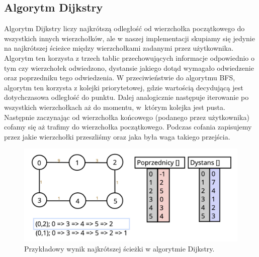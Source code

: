 \documentclass[10pt, a4paper]{report}
\begin{document}
    \subsection{Algorytm Dijkstry}
    Algorytm Dijkstry liczy najkrótszą odległość od wierzchołka początkowego do wszystkich innych wierzchołków, ale w naszej implementacji skupiamy się jedynie na najkrótszej ścieżce między wierzchołkami zadanymi przez użytkownika. 
    Algorytm ten korzysta z trzech tablic przechowujących informacje odpowiednio o tym czy wierzchołek odwiedzono, dystansie jakiego dotąd wymagało odwiedzenie oraz poprzedniku tego odwiedzenia.
    W przeciwieństwie do algorytmu BFS, algorytm ten korzysta z kolejki priorytetowej, gdzie wartością decydującą jest dotychczasowa odległość do punktu. Dalej analogicznie następuje iterowanie po wszystkich wierzchołkach 
    aż do momentu, w~którym kolejka jest pusta. Następnie zaczynając od wierzchołka końcowego (podanego przez użytkownika) cofamy się aż trafimy do wierzchołka początkowego. 
    Podczas cofania zapisujemy przez jakie wierzchołki przeszliśmy oraz jaka była waga takiego przejścia.
    \begin{figure}[h]
        \begin{center}
            \includegraphics[scale=0.15]{dijkstra_example.jpg}
            \caption{Przykładowy wynik najkrótszej ścieżki w algorytmie Dijkstry.}
        \end{center}        
    \end{figure}
\end{document}
